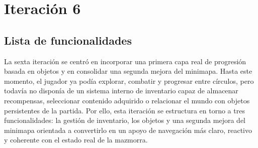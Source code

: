 \chapter{Iteración 6}

\begin{abstract}
Esta iteración introduce sistemas de soporte que amplían la profundidad de la partida. El
trabajo se centra en la gestión del inventario, la incorporación de objetos interactivos y
la evolución del minimapa, preparando una experiencia más completa y mejor estructurada.
\end{abstract}

\section{Lista de funcionalidades}
La sexta iteración se centró en incorporar una primera capa real de progresión basada en
objetos y en consolidar una segunda mejora del minimapa. Hasta este momento, el jugador ya
podía explorar, combatir y progresar entre círculos, pero todavía no disponía de un sistema
interno de inventario capaz de almacenar recompensas, seleccionar contenido adquirido o
relacionar el mundo con objetos persistentes de la partida. Por ello, esta iteración se
estructura en torno a tres funcionalidades: la gestión de inventario, los objetos y una
segunda mejora del minimapa orientada a convertirlo en un apoyo de navegación más claro,
reactivo y coherente con el estado real de la mazmorra.

